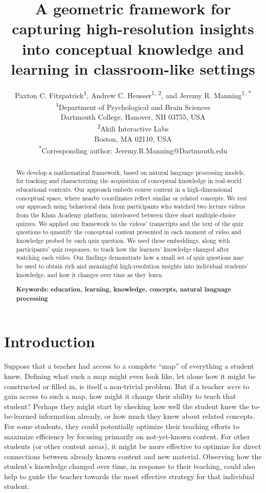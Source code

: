 \documentclass[10pt]{article}
\title{A geometric framework for capturing high-resolution insights into
conceptual knowledge and learning in classroom-like settings}
\author{Paxton C. Fitzpatrick\textsuperscript{1},
Andrew C. Heusser\textsuperscript{1, 2}, and Jeremy R.
Manning\textsuperscript{1, *}\\\small{\textsuperscript{1}Department of Psychological and Brain Sciences}\\\small{Dartmouth College, Hanover, NH 03755, USA}\\\small{\textsuperscript{2}Akili Interactive Labs}\\\small{Boston, MA 02110, USA}\\\small{\textsuperscript{*}Corresponding author:
Jeremy.R.Manning@Dartmouth.edu}}
\date{}
\begin{document}
\maketitle

\begin{abstract}\noindent We develop a mathematical framework, based on natural language
processing models, for tracking and characterizing the acquisition of
conceptual knowledge in real-world educational contexts. Our approach embeds
course content in a high-dimensional
conceptual space, where nearby coordinates reflect similar or related
concepts. We test our approach using behavioral data from participants who
watched two lecture videos from the Khan Academy platform, interleaved
between three short multiple-choice quizzes. We applied our
framework to the videos' transcripts and the text of the quiz questions to
quantify the conceptual content presented in each moment of video and knowledge probed by each quiz question. We used
these embeddings, along with participants' quiz responses, to track how the
learners' knowledge changed after watching each video. Our findings demonstrate how a
small set of quiz questions may be used to obtain rich and meaningful
high-resolution insights into individual students' knowledge, and how it
changes over time as they learn.

\textbf{Keywords: education, learning, knowledge, concepts, natural language processing}

\end{abstract}


\section*{Introduction}

Suppose that a teacher had access to a complete ``map'' of everything a
student knew. Defining what such a map might even look like, let alone how it
might be constructed or filled in, is itself a non-trivial problem. But if a
teacher \textit{were} to gain access to such a map, how might it change their
ability to teach that student? Perhaps they might start by checking how well the
student knew the to-be-learned information already, or how much they knew about
related concepts. For some students, they could potentially optimize their
teaching efforts to maximize efficiency by focusing primarily on not-yet-known
content. For other students (or other content areas), it might be more
effective to optimize for direct connections between already known content and
new material. Observing how the student's knowledge changed over time,
in response to their teaching, could also help to guide the teacher towards
the most effective strategy for that individual student.
\end{document}
